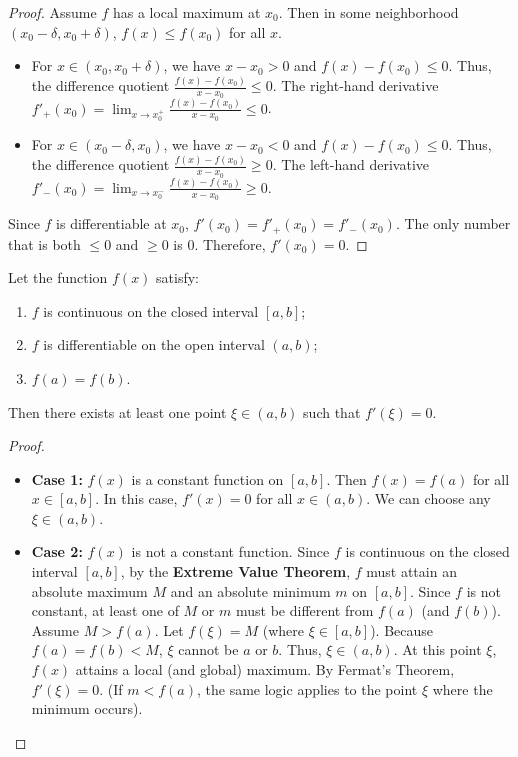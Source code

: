 \begin{proof}
Assume $f$ has a local maximum at $x_0$. Then in some neighborhood $(x_0-\delta, x_0+\delta)$, $f(x) \leq f(x_0)$ for all $x$.
\begin{itemize}
    \item For $x \in (x_0, x_0+\delta)$, we have $x - x_0 > 0$ and $f(x) - f(x_0) \leq 0$.
    Thus, the difference quotient $\frac{f(x) - f(x_0)}{x - x_0} \leq 0$.
    The right-hand derivative $f'_+(x_0) = \lim_{x \to x_0^+} \frac{f(x) - f(x_0)}{x - x_0} \leq 0$.
    
    \item For $x \in (x_0-\delta, x_0)$, we have $x - x_0 < 0$ and $f(x) - f(x_0) \leq 0$.
    Thus, the difference quotient $\frac{f(x) - f(x_0)}{x - x_0} \geq 0$.
    The left-hand derivative $f'_-(x_0) = \lim_{x \to x_0^-} \frac{f(x) - f(x_0)}{x - x_0} \geq 0$.
\end{itemize}
Since $f$ is differentiable at $x_0$, $f'(x_0) = f'_+(x_0) = f'_-(x_0)$.
The only number that is both $\leq 0$ and $\geq 0$ is $0$.
Therefore, $f'(x_0) = 0$.
\end{proof}

\begin{theorem}
\label{thm:rolle_en}
Let the function $f(x)$ satisfy:
\begin{enumerate}
    \item $f$ is continuous on the closed interval $[a, b]$;
    \item $f$ is differentiable on the open interval $(a, b)$;
    \item $f(a) = f(b)$.
\end{enumerate}
Then there exists at least one point $\xi \in (a, b)$ such that $f'(\xi) = 0$.
\end{theorem}



\begin{proof}
\begin{itemize}
    \item \textbf{Case 1:} $f(x)$ is a constant function on $[a, b]$.
    Then $f(x) = f(a)$ for all $x \in [a, b]$.
    In this case, $f'(x) = 0$ for all $x \in (a, b)$. We can choose any $\xi \in (a, b)$.
    
    \item \textbf{Case 2:} $f(x)$ is not a constant function.
    Since $f$ is continuous on the closed interval $[a, b]$, by the \textbf{Extreme Value Theorem}, $f$ must attain an absolute maximum $M$ and an absolute minimum $m$ on $[a, b]$.
    Since $f$ is not constant, at least one of $M$ or $m$ must be different from $f(a)$ (and $f(b)$).
    Assume $M > f(a)$. Let $f(\xi) = M$ (where $\xi \in [a, b]$).
    Because $f(a) = f(b) < M$, $\xi$ cannot be $a$ or $b$.
    Thus, $\xi \in (a, b)$.
    At this point $\xi$, $f(x)$ attains a local (and global) maximum.
    By Fermat's Theorem, $f'(\xi) = 0$.
    (If $m < f(a)$, the same logic applies to the point $\xi$ where the minimum occurs).
\end{itemize}
\end{proof}

